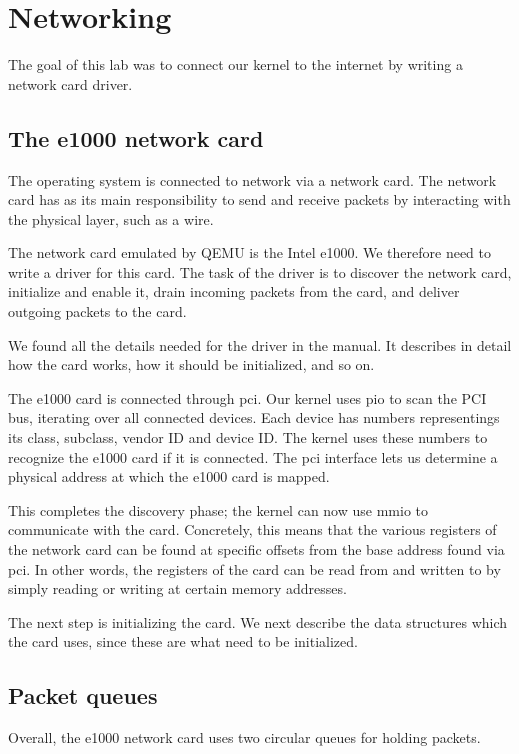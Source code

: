 \documentclass{report}
\begin{document}
\chapter{Networking}
The goal of this lab was to connect our kernel to the internet by writing a
network card driver.

\section{The e1000 network card}
The operating system is connected to network via a network card. The network
card has as its main responsibility to send and receive packets by interacting
with the physical layer, such as a wire.

The network card emulated by QEMU is the Intel e1000. We therefore need to
write a driver for this card. The task of the driver is to discover the
network card, initialize and enable it, drain incoming packets from the card,
and deliver outgoing packets to the card.

We found all the details needed for the driver in the manual. It describes in
detail how the card works, how it should be initialized, and so on.

The e1000 card is connected through \gls{pci}. Our kernel uses \gls{pio} to
scan the PCI bus, iterating over all connected devices. Each device has
numbers representings its class, subclass, vendor ID and device ID. The kernel
uses these numbers to recognize the e1000 card if it is connected. The
\gls{pci} interface lets us determine a physical address at which the e1000
card is mapped. 

This completes the discovery phase; the kernel can now use \gls{mmio} to
communicate with the card. Concretely, this means that the various registers
of the network card can be found at specific offsets from the base address
found via \gls{pci}. In other words, the registers of the card can be read
from and written to by simply reading or writing at certain memory addresses.

The next step is initializing the card. We next describe the data structures
which the card uses, since these are what need to be initialized.

\section{Packet queues}
Overall, the e1000 network card uses two circular queues for holding packets.
\end{document}
